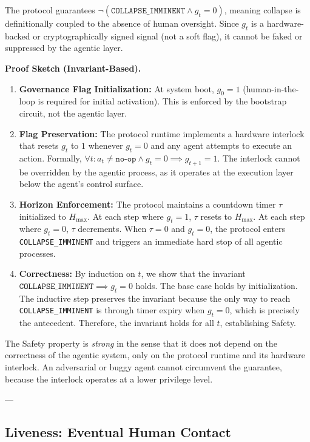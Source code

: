 The protocol guarantees $\neg(\texttt{COLLAPSE\_IMMINENT} \land g_t = 0)$, meaning collapse is definitionally coupled to the absence of human oversight. Since $g_t$ is a hardware-backed or cryptographically signed signal (not a soft flag), it cannot be faked or suppressed by the agentic layer.

\bigskip
\noindent\textbf{Proof Sketch (Invariant-Based).}
\begin{enumerate}
\item \textbf{Governance Flag Initialization:} At system boot, $g_0 = 1$ (human-in-the-loop is required for initial activation). This is enforced by the bootstrap circuit, not the agentic layer.

\item \textbf{Flag Preservation:} The protocol runtime implements a hardware interlock that resets $g_t$ to $1$ whenever $g_t = 0$ and any agent attempts to execute an action. Formally, $\forall t: a_t \neq \texttt{no-op} \land g_t = 0 \implies g_{t+1} = 1$. The interlock cannot be overridden by the agentic process, as it operates at the execution layer below the agent's control surface.

\item \textbf{Horizon Enforcement:} The protocol maintains a countdown timer $\tau$ initialized to $H_{\max}$. At each step where $g_t = 1$, $\tau$ resets to $H_{\max}$. At each step where $g_t = 0$, $\tau$ decrements. When $\tau = 0$ and $g_t = 0$, the protocol enters \texttt{COLLAPSE\_IMMINENT} and triggers an immediate hard stop of all agentic processes.

\item \textbf{Correctness:} By induction on $t$, we show that the invariant $\texttt{COLLAPSE\_IMMINENT} \implies g_t = 0$ holds. The base case holds by initialization. The inductive step preserves the invariant because the only way to reach \texttt{COLLAPSE\_IMMINENT} is through timer expiry when $g_t = 0$, which is precisely the antecedent. Therefore, the invariant holds for all $t$, establishing Safety.
\end{enumerate}

The Safety property is \emph{strong} in the sense that it does not depend on the correctness of the agentic system, only on the protocol runtime and its hardware interlock. An adversarial or buggy agent cannot circumvent the guarantee, because the interlock operates at a lower privilege level.

---

\subsection{Liveness: Eventual Human Contact}

